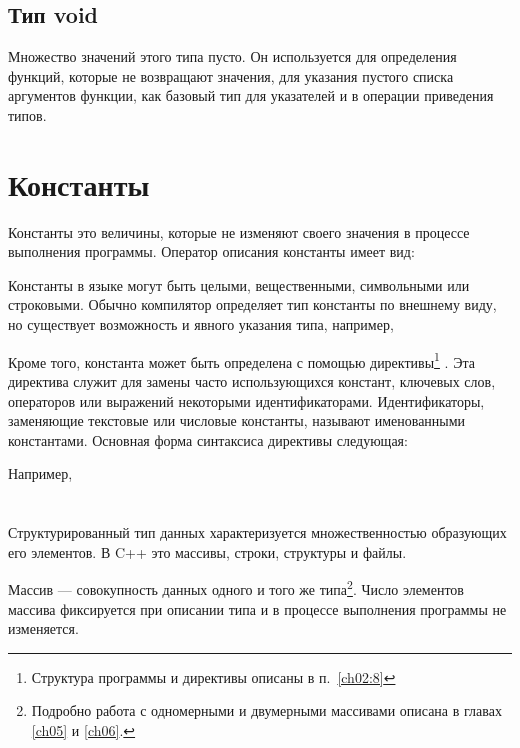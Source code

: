 
\subsection[Тип void]{Тип void}
Множество значений этого типа пусто. Он используется для определения функций, которые не возвращают значения, для
указания пустого списка аргументов функции, как базовый тип для указателей и в операции приведения типов.

\section[Константы]{Константы}
Константы это величины, которые не изменяют своего значения в процессе выполнения
программы. Оператор описания константы имеет вид:


Константы в языке  могут быть целыми, вещественными, символьными или строковыми. Обычно компилятор определяет тип
константы по внешнему виду, но существует возможность и явного указания типа, например,


Кроме того, константа может быть определена с помощью директивы\footnote{Структура программы и директивы описаны в
п.~\ref{ch02:8}}
. Эта директива служит для замены часто использующихся констант, ключевых слов,
операторов или выражений некоторыми идентификаторами. Идентификаторы, заменяющие текстовые или числовые константы,
называют {именованными константами}. Основная форма синтаксиса директивы следующая:


Например, 




\section[Структурированные типы данных]{}
Структурированный тип данных характеризуется множественностью
образующих его элементов. В C++ это массивы, строки, структуры и файлы.

Массив --- совокупность данных одного и того же типа\footnote{Подробно работа с
одномерными и двумерными массивами описана в главах \ref{ch05} и \ref{ch06}.}. Число элементов массива 
фиксируется при описании типа и в
процессе выполнения программы не изменяется.

